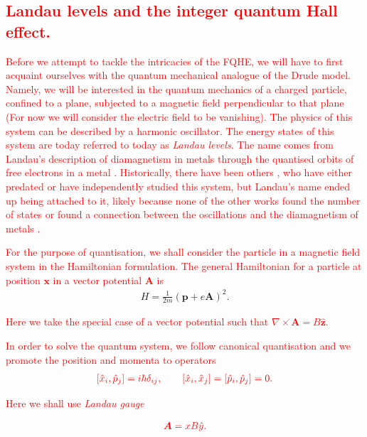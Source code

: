  \textcolor{red}{\subsection{Landau levels and the integer quantum Hall effect.}}

\textcolor{red}{Before we attempt to tackle the intricacies of the FQHE, we will have to first acquaint ourselves with the quantum mechanical analogue of the Drude model. Namely, we will be interested in the quantum mechanics of a charged particle, confined to a plane, subjected to a magnetic field perpendicular to that plane (For now we will consider the electric field to be vanishing). The physics of this system can be described by a harmonic oscillator. The energy states of this system are today referred to today as \textit{Landau levels}. The name comes from Landau's description of diamagnetism in metals through the quanti\textcolor{red}{s}ed orbits of free electrons in a metal \cite{Landau1930}. Historically, there have been others \cite{Rabi1928, Fock1928, FrenkelBronshtein1930}, who have either predated or have independently studied this system, but Landau's name ended up being attached to it, likely because none of the other works found the number of states or found a connection between the oscillations and the diamagnetism of metals \cite{shifman2013under}.}

\textcolor{red}{For the purpose of quantisation, we shall consider the particle in a magnetic field system in the Hamiltonian formulation. The general Hamiltonian for a particle at position $\bm{x}$ in a vector potential $\bm{A}$ is }
\begin{align}
    H=\frac{1}{2m}\left(\bm{p} +e \bm{A} \right)^2.
\end{align}

 \textcolor{red}{Here we take the special case of a vector potential such that $\nabla \times \bm{A} = B \hat{\bm{z}}$.}

\textcolor{red}{In order to solve the quantum system, we follow canonical quanti\textcolor{red}{s}ation and we promote the position and momenta to operators}
\begin{align}
    \textcolor{red}{[\hat{x}_i, \hat{p}_j] = i \hbar \delta_{ij}, \qquad [\hat{x}_i, \hat{x}_j]=[\hat{p}_i, \hat{p}_j]=0.}
\end{align}

\textcolor{red}{Here we shall use \textit{Landau gauge}}

\begin{align}
    \textcolor{red}{\bm{A}=  x B\hat{y}.}
\end{align}

